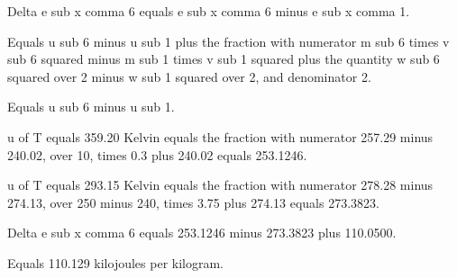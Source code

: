 Delta e sub x comma 6 equals e sub x comma 6 minus e sub x comma 1.

Equals u sub 6 minus u sub 1 plus the fraction with numerator m sub 6 times v sub 6 squared minus m sub 1 times v sub 1 squared plus the quantity w sub 6 squared over 2 minus w sub 1 squared over 2, and denominator 2.

Equals u sub 6 minus u sub 1.

u of T equals 359.20 Kelvin equals the fraction with numerator 257.29 minus 240.02, over 10, times 0.3 plus 240.02 equals 253.1246.

u of T equals 293.15 Kelvin equals the fraction with numerator 278.28 minus 274.13, over 250 minus 240, times 3.75 plus 274.13 equals 273.3823.

Delta e sub x comma 6 equals 253.1246 minus 273.3823 plus 110.0500.

Equals 110.129 kilojoules per kilogram.